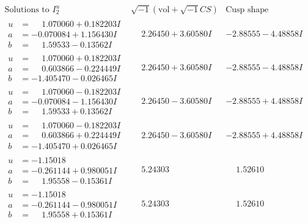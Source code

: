 \documentclass[1p]{elsarticle_modified}
\theoremstyle{definition}
\newcommand{\I}{\sqrt{-1}}
\begin{document}
$$\begin{array}{c|c|c}  
\text{Solutions to }I^u_{2}& \I (\text{vol} + \sqrt{-1}CS) & \text{Cusp shape}\\
 \hline 
\begin{aligned}
u &= \phantom{-}1.070060 + 0.182203 I \\
a &= -0.070084 + 1.156430 I \\
b &= \phantom{-}1.59533 - 0.13562 I\end{aligned}
 & \phantom{-}2.26450 + 3.60580 I & -2.88555 - 4.48858 I \\ \hline\begin{aligned}
u &= \phantom{-}1.070060 + 0.182203 I \\
a &= \phantom{-}0.603866 - 0.224449 I \\
b &= -1.405470 - 0.026465 I\end{aligned}
 & \phantom{-}2.26450 + 3.60580 I & -2.88555 - 4.48858 I \\ \hline\begin{aligned}
u &= \phantom{-}1.070060 - 0.182203 I \\
a &= -0.070084 - 1.156430 I \\
b &= \phantom{-}1.59533 + 0.13562 I\end{aligned}
 & \phantom{-}2.26450 - 3.60580 I & -2.88555 + 4.48858 I \\ \hline\begin{aligned}
u &= \phantom{-}1.070060 - 0.182203 I \\
a &= \phantom{-}0.603866 + 0.224449 I \\
b &= -1.405470 + 0.026465 I\end{aligned}
 & \phantom{-}2.26450 - 3.60580 I & -2.88555 + 4.48858 I \\ \hline\begin{aligned}
u &= -1.15018\phantom{ +0.000000I} \\
a &= -0.261144 + 0.980051 I \\
b &= \phantom{-}1.95558 - 0.15361 I\end{aligned}
 & \phantom{-}5.24303\phantom{ +0.000000I} & \phantom{-}1.52610\phantom{ +0.000000I} \\ \hline\begin{aligned}
u &= -1.15018\phantom{ +0.000000I} \\
a &= -0.261144 - 0.980051 I \\
b &= \phantom{-}1.95558 + 0.15361 I\end{aligned}
 & \phantom{-}5.24303\phantom{ +0.000000I} & \phantom{-}1.52610\phantom{ +0.000000I} \\ \hline\begin{aligned}

\end{aligned}
\end{array}$$
\end{document}
